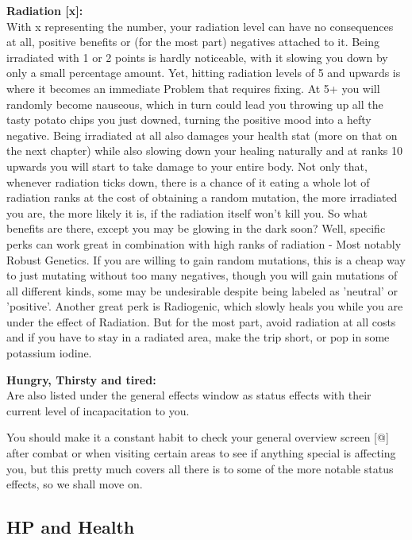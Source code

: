 \textbf{Radiation [x]:}\\With x representing the number, your radiation level can have no consequences at all, positive benefits or (for the most part) negatives attached to it. Being irradiated with 1 or 2 points is hardly noticeable, with it slowing you down by only a small percentage amount. Yet, hitting radiation levels of 5 and upwards is where it becomes an immediate Problem that requires fixing. At 5+ you will randomly become nauseous, which in turn could lead you throwing up all the tasty potato chips you just downed, turning the positive mood into a hefty negative. Being irradiated at all also damages your health stat (more on that on the next chapter) while also slowing down your healing naturally and at ranks 10 upwards you will start to take damage to your entire body. Not only that, whenever radiation ticks down, there is a chance of it eating a whole lot of radiation ranks at the cost of obtaining a random mutation, the more irradiated you are, the more likely it is, if the radiation itself won't kill you. So what benefits are there, except you may be glowing in the dark soon? Well, specific perks can work great in combination with high ranks of radiation - Most notably Robust Genetics. If you are willing to gain random mutations, this is a cheap way to just mutating without too many negatives, though you will gain mutations of all different kinds, some may be undesirable despite being labeled as 'neutral' or 'positive'. Another great perk is Radiogenic, which slowly heals you while you are under the effect of Radiation. But for the most part, avoid radiation at all costs and if you have to stay in a radiated area, make the trip short, or pop in some potassium iodine.

\textbf{Hungry, Thirsty and tired:}\\Are also listed under the general effects window as status effects with their current level of incapacitation to you.

\vspace{\baselineskip}
You should make it a constant habit to check your general overview screen [@] after combat or when visiting certain areas to see if anything special is affecting you, but this pretty much covers all there is to some of the more notable status effects, so we shall move on.

\subsection{HP and Health}

